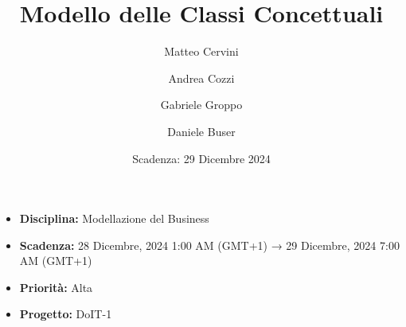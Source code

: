 \title{Modello delle Classi Concettuali}
\author{Matteo Cervini \and Andrea Cozzi \and Gabriele Groppo \and Daniele Buser}
\date{Scadenza: 29 Dicembre 2024}

\maketitle

\begin{itemize}
    \item \textbf{Disciplina:} Modellazione del Business
    \item \textbf{Scadenza:} 28 Dicembre, 2024 1:00 AM (GMT+1) → 29 Dicembre, 2024 7:00 AM (GMT+1)
    \item \textbf{Priorità:} Alta
    \item \textbf{Progetto:} DoIT-1
\end{itemize}